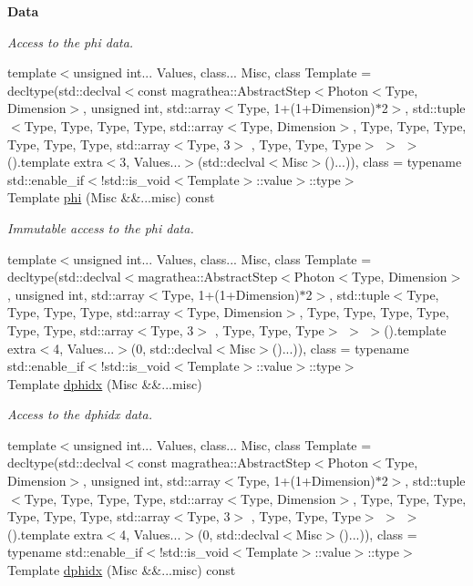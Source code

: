 \begin{Indent}{\bf Data}
\begin{DoxyCompactItemize}
\begin{DoxyCompactList}\small\item\em Access to the phi data. \end{DoxyCompactList}\item 
{\footnotesize template$<$unsigned int... Values, class... Misc, class Template  = decltype(std\-::declval$<$const magrathea\-::\-Abstract\-Step$<$\-Photon$<$\-Type, Dimension$>$, unsigned int, std\-::array$<$\-Type, 1+(1+\-Dimension)$\ast$2$>$, std\-::tuple$<$\-Type, Type, Type, Type, std\-::array$<$\-Type, Dimension$>$, Type, Type, Type, Type, Type, Type, std\-::array$<$\-Type, 3$>$ , Type, Type, Type$>$ $>$ $>$().\-template extra$<$3, Values...$>$(std\-::declval$<$\-Misc$>$()...)), class  = typename std\-::enable\-\_\-if$<$!std\-::is\-\_\-void$<$\-Template$>$\-::value$>$\-::type$>$ }\\Template \hyperlink{exceptionPhoton_a689b110df8608fe2f1d48792a52cf595}{phi} (Misc \&\&...misc) const 
\begin{DoxyCompactList}\small\item\em Immutable access to the phi data. \end{DoxyCompactList}\item 
{\footnotesize template$<$unsigned int... Values, class... Misc, class Template  = decltype(std\-::declval$<$magrathea\-::\-Abstract\-Step$<$\-Photon$<$\-Type, Dimension$>$, unsigned int, std\-::array$<$\-Type, 1+(1+\-Dimension)$\ast$2$>$, std\-::tuple$<$\-Type, Type, Type, Type, std\-::array$<$\-Type, Dimension$>$, Type, Type, Type, Type, Type, Type, std\-::array$<$\-Type, 3$>$ , Type, Type, Type$>$ $>$ $>$().\-template extra$<$4, Values...$>$(0, std\-::declval$<$\-Misc$>$()...)), class  = typename std\-::enable\-\_\-if$<$!std\-::is\-\_\-void$<$\-Template$>$\-::value$>$\-::type$>$ }\\Template \hyperlink{exceptionPhoton_a321f42369f2578df652a8b83ca3191fa}{dphidx} (Misc \&\&...misc)
\begin{DoxyCompactList}\small\item\em Access to the dphidx data. \end{DoxyCompactList}\item 
{\footnotesize template$<$unsigned int... Values, class... Misc, class Template  = decltype(std\-::declval$<$const magrathea\-::\-Abstract\-Step$<$\-Photon$<$\-Type, Dimension$>$, unsigned int, std\-::array$<$\-Type, 1+(1+\-Dimension)$\ast$2$>$, std\-::tuple$<$\-Type, Type, Type, Type, std\-::array$<$\-Type, Dimension$>$, Type, Type, Type, Type, Type, Type, std\-::array$<$\-Type, 3$>$ , Type, Type, Type$>$ $>$ $>$().\-template extra$<$4, Values...$>$(0, std\-::declval$<$\-Misc$>$()...)), class  = typename std\-::enable\-\_\-if$<$!std\-::is\-\_\-void$<$\-Template$>$\-::value$>$\-::type$>$ }\\Template \hyperlink{exceptionPhoton_af243796affab577a1b6d964157ec9468}{dphidx} (Misc \&\&...misc) const 

\end{DoxyCompactItemize}
\end{Indent}

